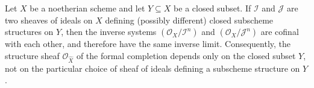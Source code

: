 Let $X$ be a noetherian scheme and let $Y \subseteq X$ be a closed subset. If $\mathcal{I}$ and $\mathcal{J}$ are two sheaves of ideals on $X$ defining (possibly different) closed subscheme structures on $Y$, then the inverse systems $(\mathcal{O}_X / \mathcal{I}^n)$ and $(\mathcal{O}_X / \mathcal{J}^n)$ are cofinal with each other, and therefore have the same inverse limit. Consequently, the structure sheaf $\mathcal{O}_{\hat{X}}$ of the formal completion depends only on the closed subset $Y$, not on the particular choice of sheaf of ideals defining a subscheme structure on $Y$.
